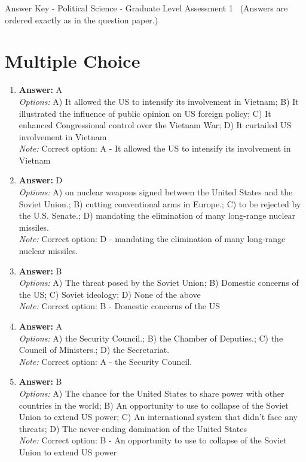 \documentclass[12pt]{article}
\begin{document}
\begin{center}
Answer Key - Political Science - Graduate Level Assessment 1 \
\small (Answers are ordered exactly as in the question paper.)
\end{center}

\section*{Multiple Choice}
\begin{enumerate}[label=\arabic*.]
\item \textbf{Answer:} A
\\ \textit{Options:} A) It allowed the US to intensify its involvement in Vietnam; B) It illustrated the influence of public opinion on US foreign policy; C) It enhanced Congressional control over the Vietnam War; D) It curtailed US involvement in Vietnam
\\ \textit{Note:} Correct option: A - It allowed the US to intensify its involvement in Vietnam
\item \textbf{Answer:} D
\\ \textit{Options:} A) on nuclear weapons signed between the United States and the Soviet Union.; B) cutting conventional arms in Europe.; C) to be rejected by the U.S. Senate.; D) mandating the elimination of many long-range nuclear missiles.
\\ \textit{Note:} Correct option: D - mandating the elimination of many long-range nuclear missiles.
\item \textbf{Answer:} B
\\ \textit{Options:} A) The threat posed by the Soviet Union; B) Domestic concerns of the US; C) Soviet ideology; D) None of the above
\\ \textit{Note:} Correct option: B - Domestic concerns of the US
\item \textbf{Answer:} A
\\ \textit{Options:} A) the Security Council.; B) the Chamber of Deputies.; C) the Council of Ministers.; D) the Secretariat.
\\ \textit{Note:} Correct option: A - the Security Council.
\item \textbf{Answer:} B
\\ \textit{Options:} A) The chance for the United States to share power with other countries in the world; B) An opportunity to use to collapse of the Soviet Union to extend US power; C) An international system that didn't face any threats; D) The never-ending domination of the United States
\\ \textit{Note:} Correct option: B - An opportunity to use to collapse of the Soviet Union to extend US power
\end{enumerate}
\end{document}
